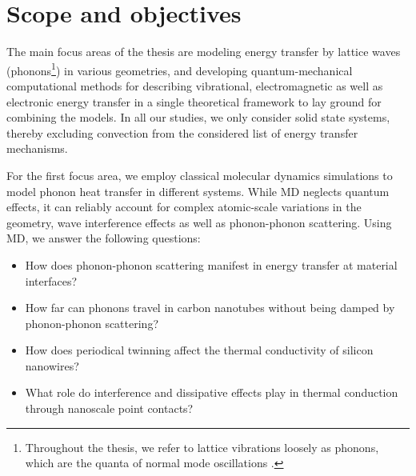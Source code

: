 

\section{Scope and objectives}

 The main focus areas of the thesis are modeling energy transfer by lattice waves (phonons\footnote{Throughout the thesis, we refer to lattice vibrations loosely as phonons, which are the quanta of normal mode oscillations \cite{ziman}.}) in various geometries, and developing quantum-mechanical computational methods for describing vibrational, electromagnetic as well as electronic energy transfer in a single theoretical framework to lay ground for combining the models. In all our studies, we only consider solid state systems, thereby excluding convection \cite{chen} from the considered list of energy transfer mechanisms. %

For the first focus area, we employ classical molecular dynamics simulations to model phonon heat transfer in different systems. While MD neglects quantum effects, it can reliably account for complex atomic-scale variations in the geometry, wave interference effects as well as phonon-phonon scattering. Using MD, we answer the following questions: 
 \begin{itemize}
  \item How does phonon-phonon scattering manifest in energy transfer at material interfaces?
  \item How far can phonons travel in carbon nanotubes without being damped by phonon-phonon scattering?
  \item How does periodical twinning affect the thermal conductivity of silicon nanowires?
  \item What role do interference and dissipative effects play in thermal conduction through nanoscale point contacts?
 \end{itemize}

